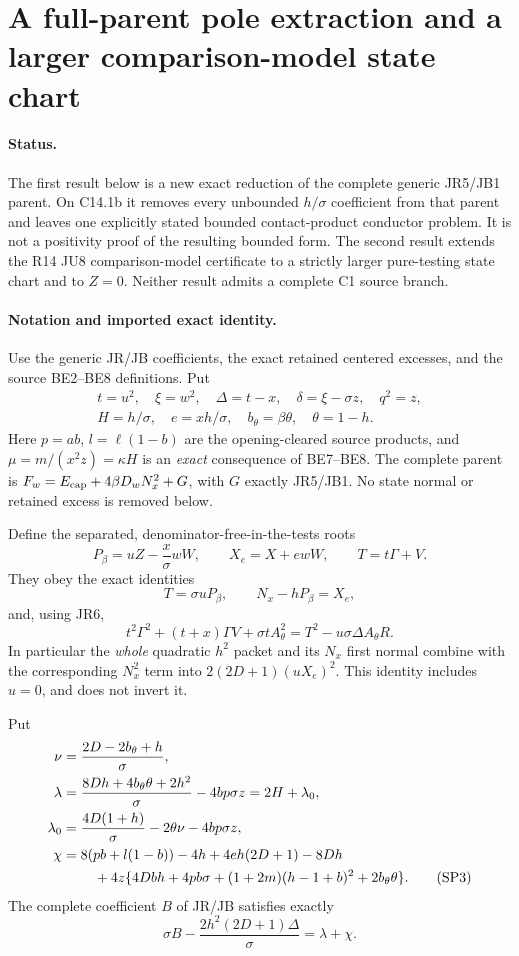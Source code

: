 \section{A full-parent pole extraction and a larger comparison-model state chart}
\label{sec:r17-c1-sphere}

\paragraph{Status.}
The first result below is a new exact reduction of the complete generic
JR5/JB1 parent. On C14.1b it removes every unbounded $h/\sigma$
coefficient from that parent and leaves one explicitly stated bounded
contact-product conductor problem. It is not a positivity proof of the
resulting bounded form. The second result extends the R14 JU8
comparison-model certificate to a strictly larger pure-testing state
chart and to $Z=0$. Neither result admits a complete C1 source branch.

\paragraph{Notation and imported exact identity.}
Use the generic JR/JB coefficients, the exact retained centered excesses,
and the source BE2--BE8 definitions. Put
\[
\begin{gathered}
 t=u^2,\quad \xi=w^2,\quad \Delta=t-x,\quad
 \delta=\xi-\sigma z,\quad q^2=z,\\
 H=h/\sigma,\quad e=xh/\sigma,\quad b_\theta=\beta\theta,
 \quad\theta=1-h.
\end{gathered}
\]
Here $p=ab$, $l=\ell(1-b)$ are the opening-cleared source products,
and $\mu=m/(x^2z)=\kappa H$ is an \emph{exact} consequence of BE7--BE8.
The complete parent is
$F_w=E_{\rm cap}+4\beta D_wN_x^2+G$, with $G$ exactly JR5/JB1.
No state normal or retained excess is removed below.

Define the separated, denominator-free-in-the-tests roots
\[
 P_\beta=uZ-\frac{x}{\sigma}wW,\qquad
 X_e=X+ewW,\qquad T=t\Gamma+V.
\]
They obey the exact identities
\[
 T=\sigma uP_\beta,\qquad N_x-hP_\beta=X_e,
 \tag{SP1}
\]
and, using JR6,
\[
 t^2\Gamma^2+(t+x)\Gamma V+\sigma tA_\theta^2
 =T^2-u\sigma\Delta A_\theta R.
 \tag{SP2}
\]
In particular the \emph{whole} quadratic $h^2$ packet and its
$N_x$ first normal combine with the corresponding $N_x^2$ term into
$2(2D+1)(uX_e)^2$. This identity includes $u=0$, and does not invert it.

Put
\begin{align*}
 \nu&=\frac{2D-2b_\theta+h}{\sigma},\\
 \lambda&=\frac{8Dh+4b_\theta\theta+2h^2}{\sigma}
                    -4bp\sigma z=2H+\lambda_0,\\
 \lambda_0&=\frac{4D(1+h)}{\sigma}-2\theta\nu-4bp\sigma z,\\
 \chi&=8(pb+l(1-b))-4h+4eh(2D+1)-8Dh\\
 &\hspace{8mm}+4z\{4Dbh+4pb\sigma+(1+2m)(h-1+b)^2
                                      +2b_\theta\theta\}.
 \tag{SP3}
\end{align*}
The complete coefficient $B$ of JR/JB satisfies exactly
\[
 \sigma B-\frac{2h^2(2D+1)\Delta}{\sigma}=\lambda+\chi.
 \tag{SP4}
\]

